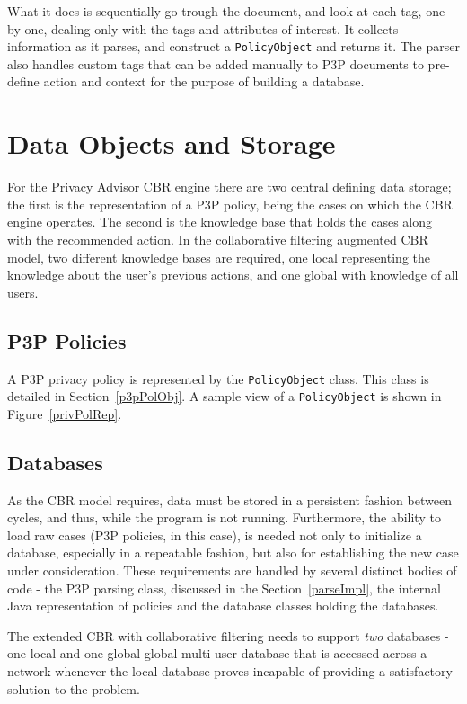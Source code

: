What it does is sequentially go trough the document, and look at each tag, one by one, dealing only with the tags and attributes of interest. It collects information as it parses, and construct a \texttt{PolicyObject} and returns it. The parser also handles custom tags that can be added manually to P3P documents to pre-define action and context for the purpose of building a database.

\section{Data Objects and Storage}

For the Privacy Advisor CBR engine there are two central defining data storage; the first is the representation of a P3P policy, being the cases on which the CBR engine operates. The second is the knowledge base that holds the cases along with the recommended action. In the collaborative filtering augmented CBR model, two different knowledge bases are required, one local representing the knowledge about the user's previous actions, and one global with knowledge of all users.

\subsection{P3P Policies}  
A P3P privacy policy is represented by the \texttt{PolicyObject} class. This class is detailed in Section~\ref{p3pPolObj}. A sample view of a \texttt{PolicyObject} is shown in Figure~\ref{privPolRep}.

\subsection{Databases}

As the CBR model requires, data must be stored in a persistent fashion between cycles, and thus, while the program is not running. Furthermore, the ability to load raw cases (P3P policies, in this case), is needed not only to initialize a database, especially in a repeatable fashion, but also for establishing the new case under consideration. These requirements are handled by several distinct bodies of code - the P3P parsing class, discussed in the Section~\ref{parseImpl}, the internal Java representation of policies and the database classes holding the databases. 

The extended CBR with collaborative filtering needs to support \emph{two} databases - one local and one global global multi-user database that is accessed across a network whenever the local database proves incapable of providing a satisfactory solution to the problem.

